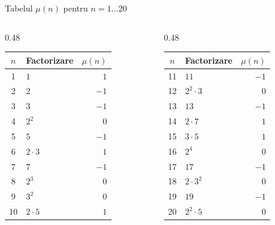 \documentclass[10pt]{beamer}
\begin{document}
\begin{frame}{Tabelul $\mu(n)$ pentru $n = 1 \ldots 20$}
  \begin{columns}[T]
    \begin{column}{0.48\textwidth}
      \begin{center}{\small
      \begin{tabular}{c|l|r}
        \toprule
        $n$ & Factorizare & $\mu(n)$ \\
        \midrule
        1  & $1$                 & $1$  \\
        2  & $2$                 & $-1$ \\
        3  & $3$                 & $-1$ \\
        4  & $2^2$               & $0$  \\
        5  & $5$                 & $-1$ \\
        6  & $2 \cdot 3$         & $1$  \\
        7  & $7$                 & $-1$ \\
        8  & $2^3$               & $0$  \\
        9  & $3^2$               & $0$  \\
        10 & $2 \cdot 5$         & $1$  \\
        \bottomrule
      \end{tabular}}
      \end{center}
    \end{column}
    \begin{column}{0.48\textwidth}
      \begin{center}{\small
      \begin{tabular}{c|l|r}
        \toprule
        $n$ & Factorizare & $\mu(n)$ \\
        \midrule
        11 & $11$                & $-1$ \\
        12 & $2^2 \cdot 3$       & $0$  \\
        13 & $13$                & $-1$ \\
        14 & $2 \cdot 7$         & $1$  \\
        15 & $3 \cdot 5$         & $1$  \\
        16 & $2^4$               & $0$  \\
        17 & $17$                & $-1$ \\
        18 & $2 \cdot 3^2$       & $0$  \\
        19 & $19$                & $-1$ \\
        20 & $2^2 \cdot 5$       & $0$  \\
        \bottomrule
      \end{tabular}}
      \end{center}
    \end{column}
  \end{columns}
\end{frame}
\end{document}
